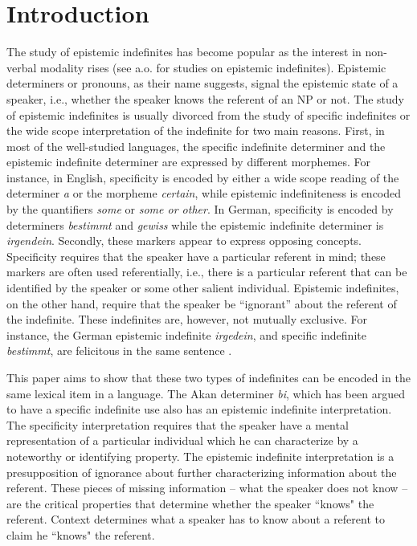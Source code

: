 \documentclass[output=paper,modfonts,nonflat,draftmode]{langsci/langscibook}
\author{Augustina Pokua Owusu\affiliation{Rutgers University}}
\begin{document}
\maketitle

\section{Introduction}\label{sec:owusu:1}
The study of epistemic indefinites has become popular as the interest in non-verbal modality rises (see \citealt{AloniPort2015,Benito2003} a.o. for studies on epistemic indefinites). Epistemic determiners or pronouns, as their name suggests, signal the epistemic state of a speaker, i.e., whether the speaker knows the referent of an NP or not. The study of epistemic indefinites is usually divorced from the study of specific indefinites or the wide scope interpretation of the indefinite for two main reasons. First, in most of the well-studied languages, the specific indefinite determiner and the epistemic indefinite determiner are expressed by different morphemes. For instance, in English, specificity is encoded by either a wide scope reading of the determiner \emph{a} or the morpheme \emph{certain}, while epistemic indefiniteness is encoded by the quantifiers \emph{some} or \emph{some or other}. In German, specificity is encoded by determiners \emph{bestimmt} and \emph{gewiss} while the epistemic indefinite determiner is \emph{irgendein}. Secondly, these markers appear to express opposing concepts. Specificity requires that the speaker have a particular referent in mind; these markers are often used referentially, i.e., there is a particular referent that can be identified by the speaker or some other salient individual. Epistemic indefinites, on the other hand, require that the speaker be ``ignorant'' about the referent of the indefinite. These indefinites are, however, not mutually exclusive. For instance, the German epistemic indefinite \emph{irgedein}, and specific indefinite \emph{bestimmt}, are felicitous in the same sentence \citep{AloniPort2015}.

This paper aims to show that these two types of indefinites can be encoded in the same lexical item in a language. The Akan determiner \emph{bi}, which has been argued to have a specific indefinite use \citep{Amfo2009,Arkoh2011} also has an epistemic indefinite interpretation. The specificity interpretation requires that the speaker have a mental representation of a particular individual which he can characterize by a noteworthy or identifying property. The epistemic indefinite interpretation is a presupposition of ignorance about further characterizing information about the referent. These pieces of missing information -- what the speaker does not know -- are the critical properties that determine whether the speaker ``knows" the referent. Context determines what a speaker has to know about a referent to claim he ``knows" the referent.\largerpage[-1]
\end{document}
